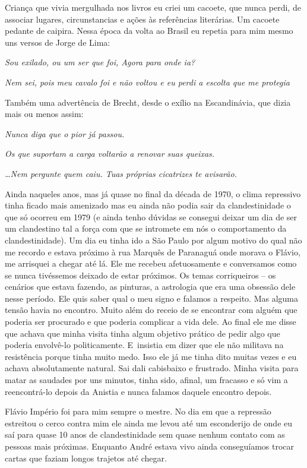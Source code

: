 Criança que vivia mergulhada nos livros eu criei um cacoete, que nunca
perdi, de associar lugares, circunstancias e ações às referências
literárias. Um cacoete pedante de caipira. Nessa época da volta ao
Brasil eu repetia para mim mesmo uns versos de Jorge de Lima:

\startblockquote
{\it Sou exilado, ou um ser que foi, Agora para onde ia?}

{\it Nem sei, pois meu cavalo foi e não voltou e eu perdi a escolta que
me protegia}

Também uma advertência de Brecht, desde o exílio na Escandinávia, que
dizia mais ou menos assim:

{\it Nunca diga que o pior já passou.}

{\it Os que suportam a carga voltarão a renovar suas queixas.}

{\it \ldots{}Nem pergunte quem caiu. Tuas próprias cicatrizes te
avisarão.}
\stopblockquote

Ainda naqueles anos, mas já quase no final da década de 1970, o clima
repressivo tinha ficado mais amenizado mas eu ainda não podia sair da
clandestinidade o que só ocorreu em 1979 (e ainda tenho dúvidas se
consegui deixar um dia de ser um clandestino tal a força com que se
intromete em nós o comportamento da clandestinidade). Um dia eu tinha
ido a São Paulo por algum motivo do qual não me recordo e estava próximo
à rua Marquês de Paranaguá onde morava o Flávio, me arrisquei a chegar
até lá. Ele me recebeu afetuosamente e conversamos como se nunca
tivéssemos deixado de estar próximos. Os temas corriqueiros -- os
cenários que estava fazendo, as pinturas, a astrologia que era uma
obsessão dele nesse período. Ele quis saber qual o meu signo e falamos a
respeito. Mas alguma tensão havia no encontro. Muito além do receio de
se encontrar com alguém que poderia ser procurado e que poderia
complicar a vida dele. Ao final ele me disse que achava que minha visita
tinha algum objetivo prático de pedir algo que poderia envolvê-lo
politicamente. E~insistia em dizer que ele não militava na resistência
porque tinha muito medo. Isso ele já me tinha dito muitas vezes e eu
achava absolutamente natural. Sai dali cabisbaixo e frustrado. Minha
visita para matar as saudades por uns minutos, tinha sido, afinal, um
fracasso e só vim a reencontrá-lo depois da Anistia e nunca falamos
daquele encontro depois.

Flávio Império foi para mim sempre o mestre. No dia em que a repressão
estreitou o cerco contra mim ele ainda me levou até um esconderijo de
onde eu saí para quase 10 anos de clandestinidade sem quase nenhum
contato com as pessoas mais próximas. Enquanto André estava vivo ainda
conseguíamos trocar cartas que faziam longos trajetos até chegar.

